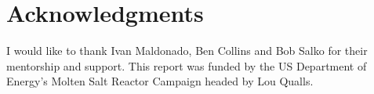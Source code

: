 \chapter*{Acknowledgments}
I would like to thank Ivan Maldonado, Ben Collins and Bob Salko for their mentorship and support. This report was funded by the US Department of Energy's Molten Salt Reactor Campaign headed by Lou Qualls. 